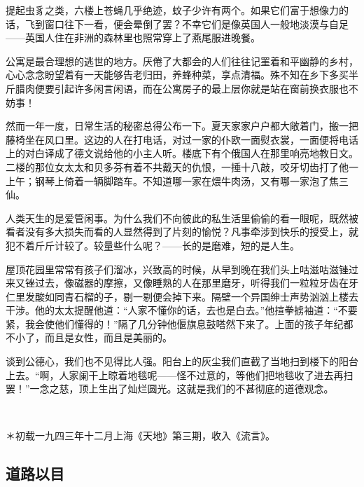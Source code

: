 \par 提起虫豸之类，六楼上苍蝇几乎绝迹，蚊子少许有两个。如果它们富于想像力的话，飞到窗口往下一看，便会晕倒了罢？不幸它们是像英国人一般地淡漠与自足——英国人住在非洲的森林里也照常穿上了燕尾服进晚餐。
\par 公寓是最合理想的逃世的地方。厌倦了大都会的人们往往记罣着和平幽静的乡村，心心念念盼望着有一天能够告老归田，养蜂种菜，享点清福。殊不知在乡下多买半斤腊肉便要引起许多闲言闲语，而在公寓房子的最上层你就是站在窗前换衣服也不妨事！
\par 然而一年一度，日常生活的秘密总得公布一下。夏天家家户户都大敞着门，搬一把藤椅坐在风口里。这边的人在打电话，对过一家的仆欧一面熨衣裳，一面便将电话上的对白译成了德文说给他的小主人听。楼底下有个俄国人在那里响亮地教日文。二楼的那位女太太和贝多芬有着不共戴天的仇恨，一捶十八敲，咬牙切齿打了他一上午；钢琴上倚着一辆脚踏车。不知道哪一家在煨牛肉汤，又有哪一家泡了焦三仙。
\par 人类天生的是爱管闲事。为什么我们不向彼此的私生活里偷偷的看一眼呢，既然被看者没有多大损失而看的人显然得到了片刻的愉悦？凡事牵涉到快乐的授受上，就犯不着斤斤计较了。较量些什么呢？——长的是磨难，短的是人生。
\par 屋顶花园里常常有孩子们溜冰，兴致高的时候，从早到晚在我们头上咕滋咕滋锉过来又锉过去，像磁器的摩擦，又像睡熟的人在那里磨牙，听得我们一粒粒牙齿在牙仁里发酸如同青石榴的子，剔一剔便会掉下来。隔壁一个异国绅士声势汹汹上楼去干涉。他的太太提醒他道：“人家不懂你的话，去也是白去。”他揎拳掳袖道：“不要紧，我会使他们懂得的！”隔了几分钟他偃旗息鼓嗒然下来了。上面的孩子年纪都不小了，而且是女性，而且是美丽的。
\par 谈到公德心，我们也不见得比人强。阳台上的灰尘我们直截了当地扫到楼下的阳台上去。“啊，人家阑干上晾着地毯呢——怪不过意的，等他们把地毯收了进去再扫罢！”一念之慈，顶上生出了灿烂圆光。这就是我们的不甚彻底的道德观念。
\par  
\par ＊初载一九四三年十二月上海《天地》第三期，收入《流言》。

\subsection{道路以目}


